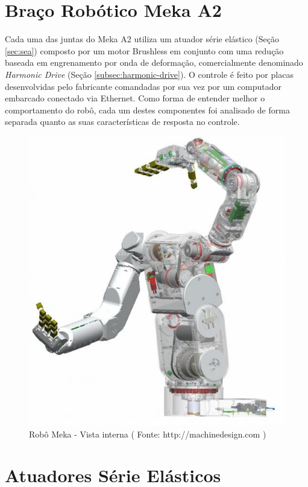 
\section{Braço Robótico Meka A2}

Cada uma das juntas do Meka A2 utiliza um atuador série elástico (Seção \ref{sec:sea}) composto por um motor Brushless em conjunto com uma redução baseada em engrenamento por onda de deformação, comercialmente denominado \textit{Harmonic Drive} (Seção \ref{subsec:harmonic-drive}). O controle é feito por placas desenvolvidas pelo fabricante comandadas por sua vez por um computador embarcado conectado via Ethernet. Como forma de entender melhor o comportamento do robô, cada um destes componentes foi analisado de forma separada quanto as suas características de resposta no controle.

\begin{figure}[H]
    \centering
    \includegraphics[width = 0.6\linewidth]{tex/figs/meka-inside.png}
    \caption{Robô Meka - Vista interna ( Fonte:  http://machinedesign.com )}
    \label{fig:meka-inside}
\end{figure}

\section{Atuadores Série Elásticos \label{sec:sea}}

